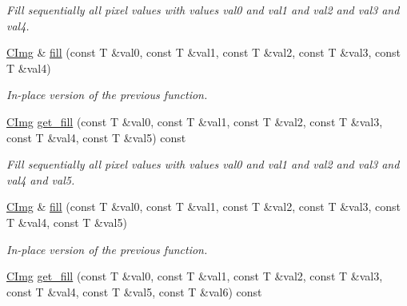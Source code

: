 \begin{DoxyCompactItemize}
\begin{DoxyCompactList}\small\item\em Fill sequentially all pixel values with values {\itshape val0} and {\itshape val1} and {\itshape val2} and {\itshape val3} and {\itshape val4}. \end{DoxyCompactList}\item 
\hypertarget{structcimg__library_1_1_c_img_a293536ba4e18be8a7e6a9e427454b0e5}{\hyperlink{structcimg__library_1_1_c_img}{C\-Img} \& \hyperlink{structcimg__library_1_1_c_img_a293536ba4e18be8a7e6a9e427454b0e5}{fill} (const T \&val0, const T \&val1, const T \&val2, const T \&val3, const T \&val4)}\label{structcimg__library_1_1_c_img_a293536ba4e18be8a7e6a9e427454b0e5}

\begin{DoxyCompactList}\small\item\em In-\/place version of the previous function. \end{DoxyCompactList}\item 
\hypertarget{structcimg__library_1_1_c_img_a383ff96266d3e77b90bb6f179797980a}{\hyperlink{structcimg__library_1_1_c_img}{C\-Img} \hyperlink{structcimg__library_1_1_c_img_a383ff96266d3e77b90bb6f179797980a}{get\-\_\-fill} (const T \&val0, const T \&val1, const T \&val2, const T \&val3, const T \&val4, const T \&val5) const }\label{structcimg__library_1_1_c_img_a383ff96266d3e77b90bb6f179797980a}

\begin{DoxyCompactList}\small\item\em Fill sequentially all pixel values with values {\itshape val0} and {\itshape val1} and {\itshape val2} and {\itshape val3} and {\itshape val4} and {\itshape val5}. \end{DoxyCompactList}\item 
\hypertarget{structcimg__library_1_1_c_img_a73ad439463a105fe882d4d226293a215}{\hyperlink{structcimg__library_1_1_c_img}{C\-Img} \& \hyperlink{structcimg__library_1_1_c_img_a73ad439463a105fe882d4d226293a215}{fill} (const T \&val0, const T \&val1, const T \&val2, const T \&val3, const T \&val4, const T \&val5)}\label{structcimg__library_1_1_c_img_a73ad439463a105fe882d4d226293a215}

\begin{DoxyCompactList}\small\item\em In-\/place version of the previous function. \end{DoxyCompactList}\item 
\hypertarget{structcimg__library_1_1_c_img_a789ffc0a25c6fd2901befd966bc0f770}{\hyperlink{structcimg__library_1_1_c_img}{C\-Img} \hyperlink{structcimg__library_1_1_c_img_a789ffc0a25c6fd2901befd966bc0f770}{get\-\_\-fill} (const T \&val0, const T \&val1, const T \&val2, const T \&val3, const T \&val4, const T \&val5, const T \&val6) const }\label{structcimg__library_1_1_c_img_a789ffc0a25c6fd2901befd966bc0f770}


\end{DoxyCompactItemize}

